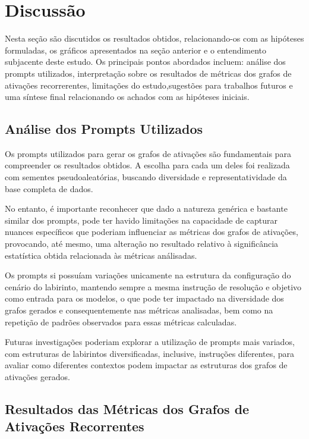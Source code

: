 \section{Discussão}\label{sec:discussao}

Nesta seção são discutidos os resultados obtidos, relacionando-os com as hipóteses formuladas, os gráficos apresentados na seção anterior e o entendimento subjacente deste estudo. Os principais pontos abordados incluem: análise dos prompts utilizados, interpretação sobre os resultados de métricas dos grafos de ativações recorrerentes, limitações do estudo,sugestões para trabalhos futuros e uma síntese final relacionando os achados com as hipóteses iniciais.

\subsection{Análise dos Prompts Utilizados}

Os prompts utilizados para gerar os grafos de ativações são fundamentais para compreender os resultados obtidos. A escolha para cada um deles foi realizada com sementes pseudoaleatórias, buscando diversidade e representatividade da base completa de dados.

No entanto, é importante reconhecer que dado a natureza genérica e bastante similar dos prompts, pode ter havido limitações na capacidade de capturar nuances específicos que poderiam influenciar as métricas dos grafos de ativações, provocando, até mesmo, uma alteração no resultado relativo à significância estatística obtida relacionada às métricas análisadas.

Os prompts si possuíam variações unicamente na estrutura da configuração do cenário do labirinto, mantendo sempre a mesma instrução de resolução e objetivo como entrada para os modelos, o que pode ter impactado na diversidade dos grafos gerados e consequentemente nas métricas analisadas, bem como na repetição de padrões observados para essas métricas calculadas.

Futuras investigações poderiam explorar a utilização de prompts mais variados, com estruturas de labirintos diversificadas, inclusive, instruções diferentes, para avaliar como diferentes contextos podem impactar as estruturas dos grafos de ativações gerados.

\subsection{Resultados das Métricas dos Grafos de Ativações Recorrentes}

